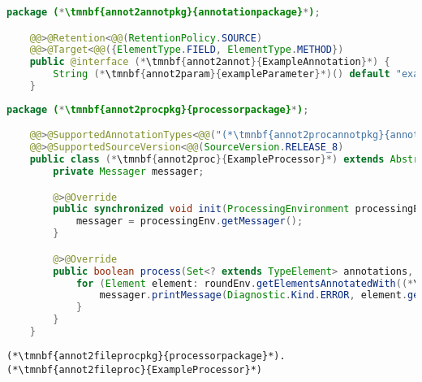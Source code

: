 \example
\begin{lstlisting}[language=Java, title={Annotation processed during compilation, included in~compiled code, applicable to~fields and~methods}]
    package (*\tmnbf{annot2annotpkg}{annotationpackage}*);

    @@>@Retention<@@(RetentionPolicy.SOURCE)
    @@>@Target<@@({ElementType.FIELD, ElementType.METHOD})
    public @interface (*\tmnbf{annot2annot}{ExampleAnnotation}*) {
        String (*\tmnbf{annot2param}{exampleParameter}*)() default "example default value";
    }
\end{lstlisting}
\begin{lstlisting}[language=Java, title={Annotation processor, working from Java~8, failing when annotated element is encountered}]
    package (*\tmnbf{annot2procpkg}{processorpackage}*);

    @@>@SupportedAnnotationTypes<@@("(*\tmnbf{annot2procannotpkg}{annotationpackage}[ForestGreen]*).(*\tmnbf{annot2procannot1}{ExampleAnnotation}[ForestGreen]*)")
    @@>@SupportedSourceVersion<@@(SourceVersion.RELEASE_8)
    public class (*\tmnbf{annot2proc}{ExampleProcessor}*) extends AbstractProcessor {
        private Messager messager;

        @>@Override
        public synchronized void init(ProcessingEnvironment processingEnv) {
            messager = processingEnv.getMessager();
        }

        @>@Override
        public boolean process(Set<? extends TypeElement> annotations, RoundEnvironment roundEnv) {
            for (Element element: roundEnv.getElementsAnnotatedWith((*\tmnbf{annot2procannot2}{ExampleAnnotation}*).class)) {
                messager.printMessage(Diagnostic.Kind.ERROR, element.getAnnotation((*\tmnbf{annot2procannot3}{ExampleAnnotation}*).class). (*\tmnbf{annot2procparam}{exampleParameter}*)(), element);
            }
        }
    }
\end{lstlisting}
\begin{lstlisting}[title={The file \textit{javax.annotation.processing.Processor}}]
    (*\tmnbf{annot2fileprocpkg}{processorpackage}*).(*\tmnbf{annot2fileproc}{ExampleProcessor}*)
\end{lstlisting}
\newpage

